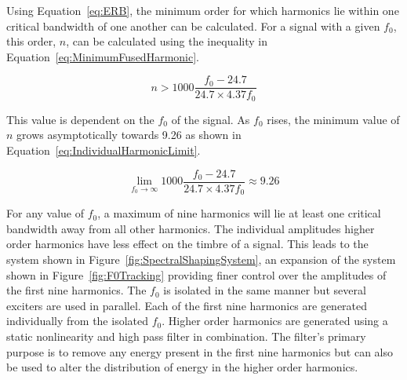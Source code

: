 		Using Equation~\ref{eq:ERB}, the minimum order for which harmonics lie within one critical bandwidth of one
		another can be calculated. For a signal with a given $f_{0}$, this order, $n$, can be calculated using the
		inequality in Equation~\ref{eq:MinimumFusedHarmonic}.


		\begin{equation}
			n > 1000 \frac{f_{0} - 24.7}{24.7 \times 4.37f_{0}}
			\label{eq:MinimumFusedHarmonic}
		\end{equation}

		This value is dependent on the $f_{0}$ of the signal. As $f_{0}$ rises, the minimum value of $n$ grows
		asymptotically towards 9.26 as shown in Equation~\ref{eq:IndividualHarmonicLimit}.

		\begin{equation}
			\lim_{f_{0} \to \infty} 1000 \frac{f_{0} - 24.7}{24.7 \times 4.37f_{0}} \approx 9.26
			\label{eq:IndividualHarmonicLimit}
		\end{equation}

		For any value of $f_{0}$, a maximum of nine harmonics will lie at least one critical bandwidth away from
		all other harmonics. The individual amplitudes higher order harmonics have less effect on the timbre of a
		signal. This leads to the system shown in Figure~\ref{fig:SpectralShapingSystem}, an expansion of the
		system shown in Figure~\ref{fig:F0Tracking} providing finer control over the amplitudes of the first nine
		harmonics. The $f_{0}$ is isolated in the same manner but several exciters are used in parallel. Each of
		the first nine harmonics are generated individually from the isolated $f_{0}$. Higher order harmonics are
		generated using a static nonlinearity and high pass filter in combination. The filter's primary purpose is
		to remove any energy present in the first nine harmonics but can also be used to alter the distribution of
		energy in the higher order harmonics.

